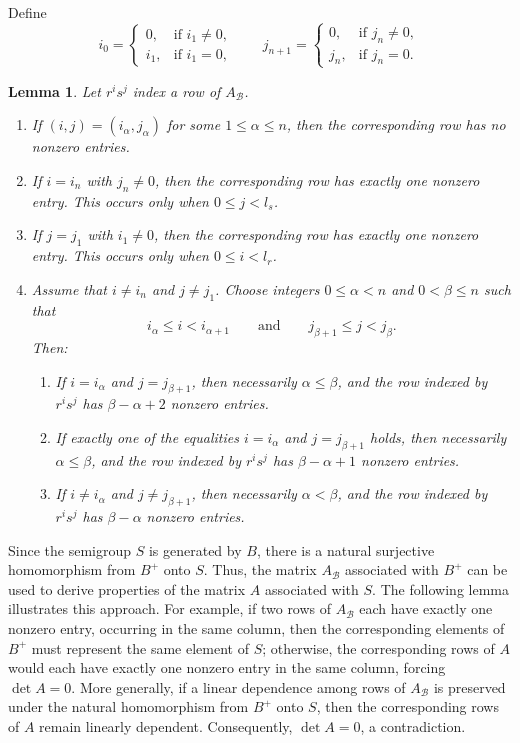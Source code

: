\documentclass[11pt,reqno]{amsart}
\theoremstyle{plain}
\newtheorem{lem}[thm]{Lemma}
\theoremstyle{remark}
\theoremstyle{definition}
\begin{document}
Define
\[
i_0=
\begin{cases}
0, & \text{if } i_1\neq0,\\
i_1, & \text{if } i_1=0,
\end{cases}
\qquad
j_{n+1}=
\begin{cases}
0, & \text{if } j_n\neq0,\\
j_n, & \text{if } j_n=0.
\end{cases}
\]

\begin{lem}\label{ijNonZeroEntry}
Let $r^is^j$ index a row of $A_{\mathcal B}$.

\begin{enumerate}
\item If $(i,j)=(i_\alpha,j_\alpha)$ for some $1\leq\alpha\leq n$, then the corresponding row has no nonzero entries.

\item If $i=i_n$ with $j_n\neq 0$, then the corresponding row has exactly one nonzero entry. This occurs only when $0\leq j<l_s$.

\item If $j=j_1$ with $i_1\neq 0$, then the corresponding row has exactly one nonzero entry. This occurs only when $0\leq i<l_r$.

\item Assume that $i\neq i_n$ and $j\neq j_1$. 
Choose integers $0\leq\alpha<n$ and $0<\beta\leq n$ such that
\[
i_\alpha\leq i<i_{\alpha+1}
\qquad\text{and}\qquad
j_{\beta+1}\leq j<j_\beta.
\]
Then:
\begin{enumerate}
\item If $i=i_\alpha$ and $j=j_{\beta+1}$, then necessarily $\alpha\leq\beta$, and the row indexed by $r^is^j$ has $\beta-\alpha+2$ nonzero entries.

\item If exactly one of the equalities $i=i_\alpha$ and $j=j_{\beta+1}$ holds, then necessarily $\alpha\leq\beta$, and the row indexed by $r^is^j$ has $\beta-\alpha+1$ nonzero entries.

\item If $i\neq i_\alpha$ and $j\neq j_{\beta+1}$, then necessarily $\alpha<\beta$, and the row indexed by $r^is^j$ has $\beta-\alpha$ nonzero entries.
\end{enumerate}
\end{enumerate}
\end{lem}

Since the semigroup $S$ is generated by $B$, there is a natural surjective homomorphism from $B^{+}$ onto $S$. Thus, the matrix $A_{\mathcal B}$ associated with $B^{+}$ can be used to derive properties of the matrix $A$ associated with $S$.
The following lemma illustrates this approach. For example, if two rows of $A_{\mathcal B}$ each have exactly one nonzero entry, occurring in the same column, then the corresponding elements of $B^{+}$ must represent the same element of $S$; otherwise, the corresponding rows of $A$ would each have exactly one nonzero entry in the same column, forcing $\det A=0$. More generally, if a linear dependence among rows of $A_{\mathcal B}$ is preserved under the natural homomorphism from $B^{+}$ onto $S$, then the corresponding rows of $A$ remain linearly dependent. Consequently, $\det A=0$, a contradiction.
\end{document}
